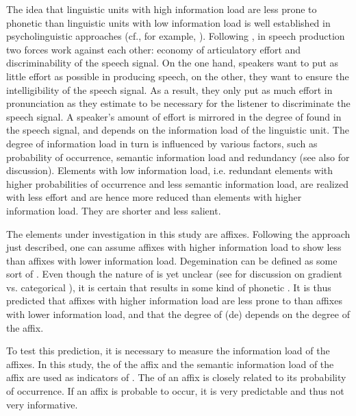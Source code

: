 The idea that linguistic units with high information load are less prone to phonetic  than linguistic units with low information load is well established in psycholinguistic approaches  (cf., for example, \citealt{Aylett.2004,Kuperman.2007,Pluymaekers.2010,Hanique.2012}). Following \cite{Lindblom.1990}, in speech production two forces work against each other: economy of articulatory effort and discriminability of the speech signal. On the one hand, speakers want to put as little effort as possible in producing speech, on the other, they want to ensure the intelligibility of the speech signal. As a result, they only put as much effort in pronunciation as they estimate to be necessary for the listener to discriminate the speech signal. A speaker's amount of effort is mirrored in the degree of  found in the speech signal, and depends on the information load of the linguistic unit. The degree of information load in turn is influenced by various factors, such as probability of occurrence, semantic information load and redundancy (see also \citealt{Kuperman.2007} for discussion).  
Elements with low information load, i.e. redundant elements with higher probabilities of occurrence and less semantic information load, are realized with less effort and are hence more reduced than elements with higher information load. They are shorter and less salient. 

The elements under investigation in this study are affixes. Following the approach just described, one can assume affixes with higher information load to show less  than affixes with lower information load. Degemination can be defined as some sort of . Even though the nature of  is yet unclear (see  for discussion on gradient vs. categorical ), it is certain that  results in some kind of phonetic . It is thus predicted that affixes with higher information load are less prone to  than affixes with lower information load, and that the degree of (de) depends on the degree  of the affix.

To test this prediction, it is necessary to measure the information load of the affixes.
 In this study, the  of the affix and the semantic information load of the affix are used as indicators of .
The  of an affix is closely related to its probability of occurrence. 
 If an affix is probable to occur, it is very predictable and thus not very informative. %

